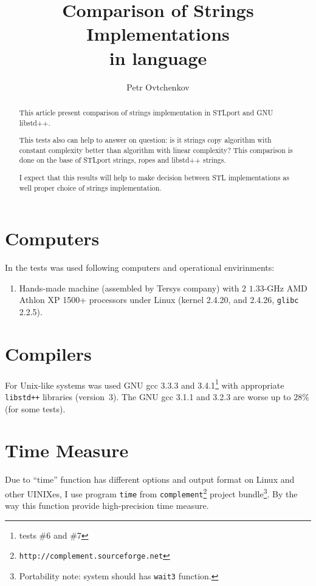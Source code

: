 \documentclass[a4paper]{article}
\title{Comparison of Strings Implementations \\ in \CPP{} language}
\author{Petr Ovtchenkov}
\providecommand{\STLport}{{\fontfamily{cmss}\selectfont STLport}}
\providecommand{\libstd}{{\fontfamily{cmtt}\selectfont GNU \mbox{libstd++}}}
\begin{document}
\maketitle

\begin{abstract}
This article present comparison of 
strings implementation in \STLport{} and \libstd.

This tests also can help to answer on question:
is it strings copy algorithm with constant complexity
better than algorithm with linear complexity?
This comparison is done on the base of STLport strings, ropes
and libstd++ strings.

I expect that this results will help to make decision between
STL implementations as well proper choice of strings implementation.
\end{abstract}

\section{Computers}

In the tests was used following computers and operational envirinments:
\begin{enumerate}
  \item Hands-made machine (assembled by Tersys company) with 2 $1.33$-GHz
        AMD Athlon XP 1500+ processors under Linux (kernel 2.4.20, and 2.4.26, \verb|glibc| 2{.}2{.}5).
\end{enumerate}

\section{Compilers}

For Unix-like systems was used GNU gcc 3{.}3{.}3 and 3{.}4{.}1\footnote{tests \#6 and \#7} %
with appropriate
\verb|libstd++| libraries (version~3).
The GNU gcc 3{.}1{.}1 and 3{.}2{.}3 are worse up to $28\%$ (for some
tests).

\section{Time Measure\label{timemeasure}}

Due to ``time'' function has different options and output format on Linux
and other UINIXes, I use program \texttt{time} from
\texttt{complement}\footnote{\texttt{http://complement.sourceforge.net}}
project bundle\footnote{Portability note: system should has \texttt{wait3} function.}.
By the way this function provide high-precision time measure.
\end{document}
